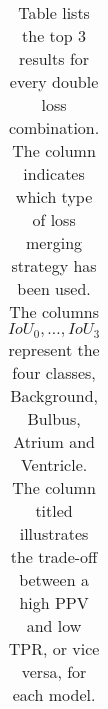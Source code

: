 \begin{table}[H]
{\begin{tabular}{cc|l|cc|c|c|c|c|c|c|c|c|}
  \end{tabular}%
  }
  \caption[Top double discrete loss combination results (Medaka Fish)]{Table lists the top 3 results for every double loss combination. The column  indicates which type of loss merging strategy has been used. The columns $IoU_0,\hdots,IoU_3$ represent the four classes, Background, Bulbus, Atrium and Ventricle.  The column titled  illustrates the trade-off between a high \acf{PPV} and low \acf{TPR}, or vice versa, for each model.}
  \label{tab:loss_combination_results_medaka_double_long}
  \end{table}